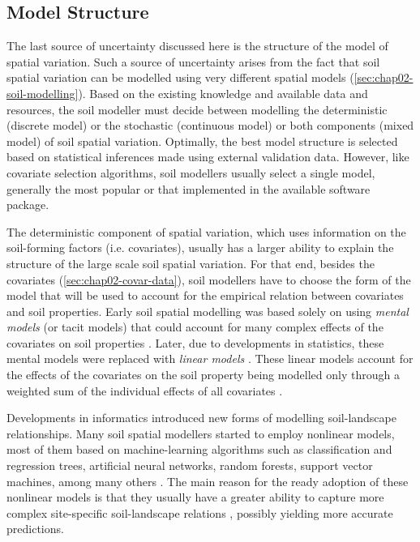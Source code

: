 \subsection{Model Structure}


The last source of uncertainty discussed here is the structure of the model of spatial variation. Such a 
source of uncertainty arises from the fact that soil spatial variation can be modelled using very different 
spatial models (\autoref{sec:chap02-soil-modelling}). Based on the existing knowledge and available data and 
resources, the soil modeller must decide between modelling the deterministic (discrete model) or the 
stochastic (continuous model) or both components (mixed model) of soil spatial variation. Optimally, the best 
model structure is selected based on statistical inferences made using external validation data. However, like 
covariate selection algorithms, soil modellers usually select a single model, generally the most popular or 
that implemented in the available software package.

The deterministic component of spatial variation, which uses information on the soil-forming factors (i.e. 
covariates), usually has a larger ability to explain the structure of the large scale soil spatial variation. 
For that end, besides the covariates (\autoref{sec:chap02-covar-data}), soil modellers have to choose the form 
of the model that will be used to account for the empirical relation between covariates and soil properties. 
Early soil spatial modelling was based solely on using \emph{mental models} (or tacit models) that could 
account for many complex effects of the covariates on soil properties \cite{Hudson1992}. Later, due to 
developments in statistics, these mental models were replaced with \emph{linear models} \cite{MooreEtAl1993, 
OdehEtAl1994}. These linear models account for the effects of the covariates on the soil property being 
modelled only through a weighted sum of the individual effects of all covariates \cite{Harrell2001a}. 

Developments in informatics introduced new forms of modelling soil-landscape relationships. Many soil spatial 
modellers started to employ nonlinear models, most of them based on machine-learning algorithms such as 
classification and regression trees, artificial neural networks, random forests, support vector machines, among 
many others \cite{McBratneyEtAl2000, HeungEtAl2016}. The main reason for the ready adoption of these nonlinear 
models is that they usually have a greater ability to capture more complex site-specific soil-landscape 
relations \cite{Grunwald2009}, possibly yielding more accurate predictions.


